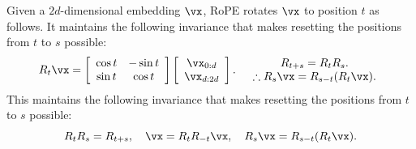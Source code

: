 Given a $2d$-dimensional embedding $\vx$,
RoPE rotates $\vx$ to position $t$ as follows.
It maintains the following invariance that makes resetting the positions from $t$ to $s$ possible:
\[
 R_t\vx =
 \left[
 \begin{array}{cc}
  \cos t & -\sin t \\
  \sin t & \cos t
 \end{array}
 \right]
 \left[
 \begin{array}{c}
  \vx_{0:d} \\
  \vx_{d:2d}
 \end{array}
 \right].
 \quad
 \begin{array}{c}
  R_{t+s}  = R_t R_s. \\
  \therefore R_s\vx = R_{s-t}(R_t\vx). \\
 \end{array}
\]
This maintains the following invariance that makes resetting the positions from $t$ to $s$ possible:
\[
 R_tR_s=R_{t+s}, \quad
 \vx = R_tR_{-t}\vx, \quad
 R_s\vx = R_{s-t}(R_t\vx).
\]
